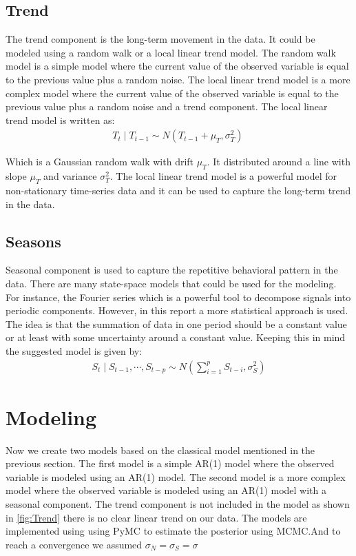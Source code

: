 \documentclass{IEEEtran}
\begin{document}
  \subsection{Trend}
  The trend component is the long-term movement in the data. It could be modeled using a random walk or a local linear trend model. The random walk model is a simple model where the current value of the observed variable is equal to the previous value plus a random noise. The local linear trend model is a more complex model where the current value of the observed variable is equal to the previous value plus a random noise and a trend component. The local linear trend model is written as:
  \begin{gather}
    \label{eq:trend}
    T_t \mid T_{t-1} \sim N(T_{t-1} + \mu_T, \sigma^2_T)\
  \end{gather}

  Which is a Gaussian random walk with drift \(\mu_T\). It distributed around a line with slope \(\mu_T\) and variance \(\sigma^2_T\). The local linear trend model is a powerful model for non-stationary time-series data and it can be used to capture the long-term trend in the data.

  \subsection{Seasons}
  Seasonal component is used to capture the repetitive behavioral pattern in the data. There are many state-space models that could be used for the modeling. For instance, the Fourier series which is a powerful tool to decompose signals into periodic components. However, in this report a more statistical approach is used. The idea is that the summation of data in one period should be a constant value or at least with some uncertainty around a constant value. Keeping this in mind the suggested model is given by:
  \begin{gather}
    \label{eq:seasonal}
    S_t \mid S_{t-1},\cdots, S_{t-p} \sim N(\sum_{i=1}^p S_{t-i}, \sigma^2_S)
  \end{gather}

  \section{Modeling}
  Now we create two models based on the classical model mentioned in the previous section. The first model is a simple AR(1) model where the observed variable is modeled using an AR(1) model. The second model is a more complex model where the observed variable is modeled using an AR(1) model with a seasonal component. The trend component is not included in the model as shown in \ref{fig:Trend} there is no clear linear trend on our data. The models are implemented using using PyMC to estimate the posterior using MCMC.And to reach a convergence we assumed \(\sigma_N = \sigma_S = \sigma\)
\end{document}
